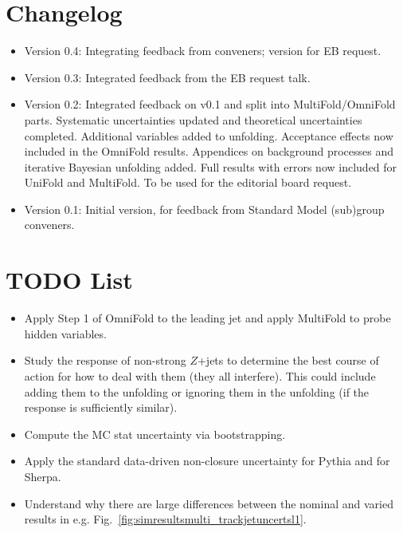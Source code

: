 \section{Changelog}

\begin{itemize}
\item Version 0.4: Integrating feedback from conveners; version for EB request.
\item Version 0.3: Integrated feedback from the EB request talk.
\item Version 0.2: Integrated feedback on v0.1 and split into MultiFold/OmniFold parts. Systematic uncertainties updated and theoretical uncertainties completed. Additional variables added to unfolding. Acceptance effects now included in the OmniFold results. Appendices on background processes and iterative Bayesian unfolding added.  Full results with errors now included for UniFold and MultiFold. To be used for the editorial board request.
\item Version 0.1: Initial version, for feedback from Standard Model (sub)group conveners.
\end{itemize}

\section{TODO List}
\label{sec:todo}

\begin{itemize}
\item Apply Step 1 of OmniFold to the leading jet and apply MultiFold to probe hidden variables.
\item Study the response of non-strong $Z$+jets to determine the best course of action for how to deal with them (they all interfere).   This could include adding them to the unfolding or ignoring them in the unfolding (if the response is sufficiently similar).
\item Compute the MC stat uncertainty via bootstrapping.
\item Apply the standard data-driven non-closure uncertainty for Pythia and for Sherpa.
\item Understand why there are large differences between the nominal and varied results in e.g. Fig.~\ref{fig:simresultsmulti_trackjetuncertsl1}.
\end{itemize}